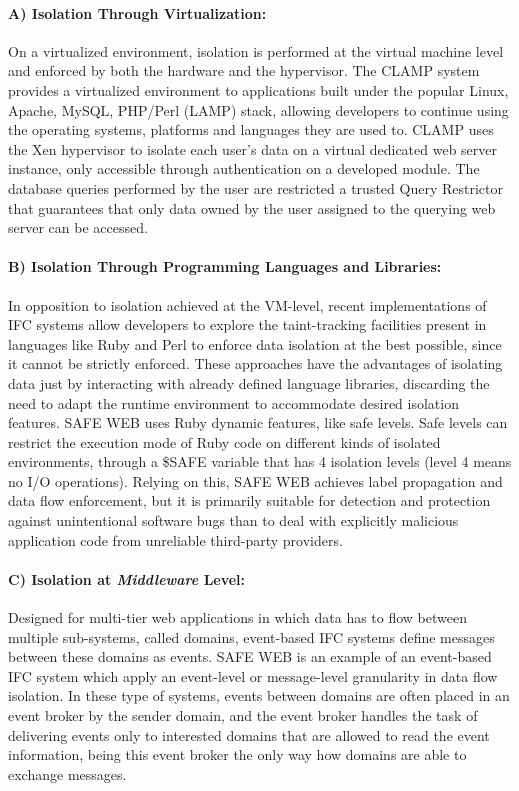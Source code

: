 \paragraph{A) Isolation Through Virtualization:}
On a virtualized environment, isolation is performed at the virtual machine level and enforced by both the hardware and the hypervisor. The CLAMP system \cite{clamp} provides a virtualized environment to applications built under the popular Linux, Apache, MySQL, PHP/Perl (LAMP) stack, allowing developers to continue using the operating systems, platforms and languages they are used to. CLAMP uses the Xen hypervisor to isolate each user's data on a virtual dedicated web server instance, only accessible through authentication on a developed module. The database queries performed by the user are restricted a trusted Query Restrictor that guarantees that only data owned by the user assigned to the querying web server can be accessed.

\paragraph{B) Isolation Through Programming Languages and Libraries:}
In opposition to isolation achieved at the VM-level, recent implementations of IFC systems allow developers to explore the taint-tracking facilities present in languages like Ruby and Perl to enforce data isolation at the best possible, since it cannot be strictly enforced. These approaches have the advantages of isolating data just by interacting with already defined language libraries, discarding the need to adapt the runtime environment to accommodate desired isolation features. SAFE WEB \cite{safeweb} uses Ruby dynamic features, like safe levels. Safe levels can restrict the execution mode of Ruby code on different kinds of isolated environments, through a \$SAFE variable that has 4 isolation levels (level 4 means no I/O operations). Relying on this, SAFE WEB achieves label propagation and data flow enforcement, but it is primarily suitable for detection and protection against unintentional software bugs than to deal with explicitly malicious application code from unreliable third-party providers.

\paragraph{C) Isolation at \textit{Middleware} Level:}
Designed for multi-tier web applications in which data has to flow between multiple sub-systems, called domains, event-based IFC systems define messages between these domains as events. SAFE WEB is an example of an event-based IFC system which apply an event-level or message-level granularity in data flow isolation. In these type of systems, events between domains are often placed in an event broker by the sender domain, and the event broker handles the task of delivering events only to interested domains that are allowed to read the event information, being this event broker the only way how domains are able to exchange messages.

